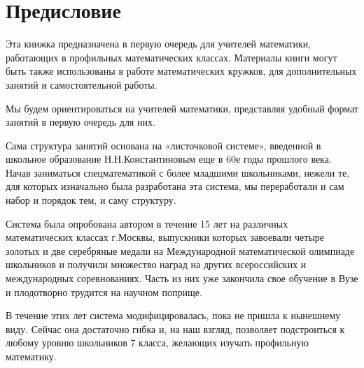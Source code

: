 
		\section{Предисловие}

	Эта книжка предназначена в первую очередь для учителей математики, работающих в профильных математических классах. Материалы книги могут быть также использованы в работе математических кружков, для дополнительных занятий и самостоятельной работы.
	
	Мы будем ориентироваться на учителей математики, представляя удобный формат занятий в первую очередь для них.
	
	Сама структура занятий основана на «листочковой системе», введенной в школьное образование Н.Н.Константиновым еще в 60е годы прошлого века. Начав заниматься спецматематикой с более младшими школьниками, нежели те, для которых изначально была разработана эта система, мы переработали и сам набор и порядок тем, и саму структуру.
	 
	Система была опробована автором в течение 15 лет на различных математических классах г.Москвы, выпускники которых завоевали четыре золотых и две серебряные медали на Международной математической олимпиаде школьников и получили множество наград на других всероссийских и международных соревнованиях. Часть из них уже закончила свое обучение в Вузе и плодотворно трудится на научном поприще.
	
	В течение этих лет система модифицировалась, пока не пришла к нынешнему виду. Сейчас она достаточно гибка и, на наш взгляд, позволяет подстроиться к любому уровню школьников 7 класса, желающих изучать профильную математику.
	
